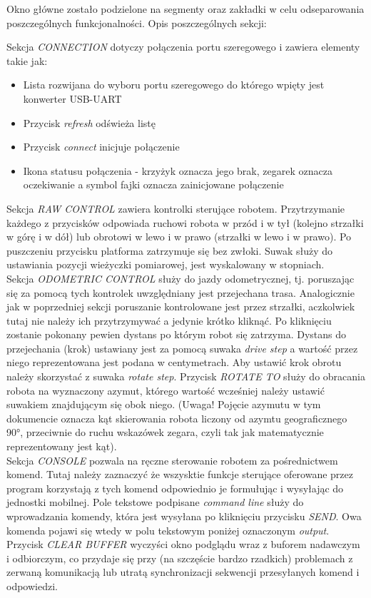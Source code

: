 Okno główne zostało podzielone na segmenty oraz zakładki w celu odseparowania poszczególnych funkcjonalności. Opis poszczególnych sekcji:

Sekcja \emph{CONNECTION} dotyczy połączenia portu szeregowego i zawiera elementy takie jak:
\begin{itemize}
    \item Lista rozwijana do wyboru portu szeregowego do którego wpięty jest konwerter USB-UART
    \item Przycisk \emph{refresh} odświeża listę
    \item Przycisk \emph{connect} inicjuje połączenie
    \item Ikona statusu połączenia - krzyżyk oznacza jego brak, zegarek oznacza oczekiwanie a symbol fajki oznacza zainicjowane połączenie
\end{itemize}

Sekcja \emph{RAW CONTROL} zawiera kontrolki sterujące robotem. Przytrzymanie każdego z przycisków odpowiada ruchowi robota w przód i w tył (kolejno strzałki w górę i w dół) lub obrotowi w lewo i w prawo (strzałki w lewo i w prawo). Po puszczeniu przycisku platforma zatrzymuje się bez zwłoki. Suwak służy do ustawiania pozycji wieżyczki pomiarowej, jest wyskalowany w stopniach.
\\

Sekcja \emph{ODOMETRIC CONTROL} służy do jazdy odometrycznej, tj. poruszając się za pomocą tych kontrolek uwzględniany jest przejechana trasa. Analogicznie jak w poprzedniej sekcji poruszanie kontrolowane jest przez strzałki, aczkolwiek tutaj nie należy ich przytrzymywać a jedynie krótko kliknąć. Po kliknięciu zostanie pokonany pewien dystans po którym robot się zatrzyma. Dystans do przejechania (krok) ustawiany jest za pomocą suwaka \emph{drive step} a wartość przez niego reprezentowana jest podana w centymetrach. Aby ustawić krok obrotu należy skorzystać z suwaka \emph{rotate step}. Przycisk \emph{ROTATE TO} służy do obracania robota na wyznaczony azymut, którego wartość wcześniej należy ustawić suwakiem znajdującym się obok niego. (Uwaga! Pojęcie azymutu w tym dokumencie oznacza kąt skierowania robota liczony od azymtu geograficznego 90°, przeciwnie do ruchu wskazówek zegara, czyli tak jak matematycznie reprezentowany jest kąt).
\\

Sekcja \emph{CONSOLE} pozwala na ręczne sterowanie robotem za pośrednictwem komend. Tutaj należy zaznaczyć że wszysktie funkcje sterujące oferowane przez program korzystają z tych komend odpowiednio je formułując i wysyłając do jednostki mobilnej. Pole tekstowe podpisane \emph{command line} służy do wprowadzania komendy, która jest wysyłana po kliknięciu przycisku \emph{SEND}.
Owa komenda pojawi się wtedy w polu tekstowym poniżej oznaczonym \emph{output}. Przycisk \emph{CLEAR BUFFER} wyczyści okno podglądu wraz z buforem nadawczym i odbiorczym, co przydaje się przy (na szczęście bardzo rzadkich) problemach z zerwaną komunikacją lub utratą synchronizacji sekwencji przesyłanych komend i odpowiedzi.
\\

